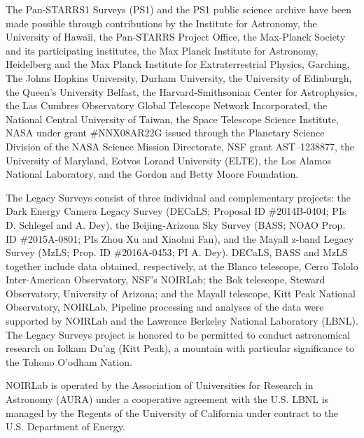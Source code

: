 \documentclass[twocolumn,twocolappendix, linenumbers, trackchanges]{aastex7}
\begin{document}
The Pan-STARRS1 Surveys (PS1) and the PS1 public science archive have been made possible through contributions by the Institute for Astronomy, the University of Hawaii, the Pan-STARRS Project Office, the Max-Planck Society and its participating institutes, the Max Planck Institute for Astronomy, Heidelberg and the Max Planck Institute for Extraterrestrial Physics, Garching, The Johns Hopkins University, Durham University, the University of Edinburgh, the Queen's University Belfast, the Harvard-Smithsonian Center for Astrophysics, the Las Cumbres Observatory Global Telescope Network Incorporated, the National Central University of Taiwan, the Space Telescope Science Institute, NASA under grant  \#NNX08AR22G issued through the Planetary Science Division of the NASA Science Mission Directorate, NSF grant AST–1238877, the University of Maryland, Eotvos Lorand University (ELTE), the Los Alamos National Laboratory, and the Gordon and Betty Moore Foundation.

The Legacy Surveys consist of three individual and complementary projects: the Dark Energy Camera Legacy Survey (DECaLS; Proposal ID \#2014B-0404; PIs D. Schlegel and A. Dey), the Beijing-Arizona Sky Survey (BASS; NOAO Prop. ID \#2015A-0801; PIs Zhou Xu and Xiaohui Fan), and the Mayall z-band Legacy Survey (MzLS; Prop. ID \#2016A-0453; PI A. Dey). DECaLS, BASS and MzLS together include data obtained, respectively, at the Blanco telescope, Cerro Tololo Inter-American Observatory, NSF’s NOIRLab; the Bok telescope, Steward Observatory, University of Arizona; and the Mayall telescope, Kitt Peak National Observatory, NOIRLab. Pipeline processing and analyses of the data were supported by NOIRLab and the Lawrence Berkeley National Laboratory (LBNL). The Legacy Surveys project is honored to be permitted to conduct astronomical research on Iolkam Du’ag (Kitt Peak), a mountain with particular significance to the Tohono O’odham Nation.

NOIRLab is operated by the Association of Universities for Research in Astronomy (AURA) under a cooperative agreement with the U.S. LBNL is managed by the Regents of the University of California under contract to the U.S. Department of Energy.
\end{document}
